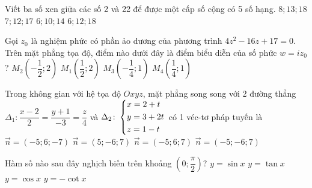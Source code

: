 \begin{ex}%
Viết ba số xen giữa các số 2 và 22 để được một cấp số cộng có 5 số hạng. 
	\choice
	{$8; 13; 18$}
	{\True $7; 12; 17$}
	{$6; 10; 14$}
	{$6; 12; 18$}
\end{ex}

\begin{ex}%
Gọi $z_0$ là nghiệm phức có phần ảo dương của phương trình $4z^2 - 16z + 17 = 0$. Trên mặt phẳng tọa độ, điểm nào dưới đây là điểm biểu diễn của số phức $w = iz_0$? 
	\choice
	{\True $M_2\left(- \dfrac{1}{2}; 2\right)$}
	{$M_1\left(\dfrac{1}{2}; 2\right)$}
	{$M_3\left(- \dfrac{1}{4}; 1\right)$}
	{$M_4\left(\dfrac{1}{4}; 1\right)$}
\end{ex}

\begin{ex}%
Trong không gian với hệ tọa độ $Oxyz$, mặt phẳng song song với 2 đường thẳng $\Delta_1 \colon \dfrac{x - 2}{2} = \dfrac{y + 1}{-3} = \dfrac{z}{4}$ và $\Delta_2 \colon \left\{\begin{aligned}& x = 2 + t\\ & y = 3 + 2t \\ & z = 1- t\end{aligned}\right.$ có 1 véc-tơ pháp tuyến là 
	\choice
	{$\vec{n} = (-5; 6; -7)$}
	{$\vec{n} = (5; - 6 ; 7)$}
	{\True $\vec{n} = (-5; 6; 7)$}
	{$\vec{n} = (-5; -6; 7)$}
\end{ex}

\begin{ex}%
Hàm số nào sau đây nghịch biến trên khoảng $\left(0; \dfrac{\pi}{2}\right)$?
	\choice
	{$y = \sin x$}
	{$y = \tan x$}
	{\True $y = \cos x$}
	{$y = - \cot x$}
\end{ex}

